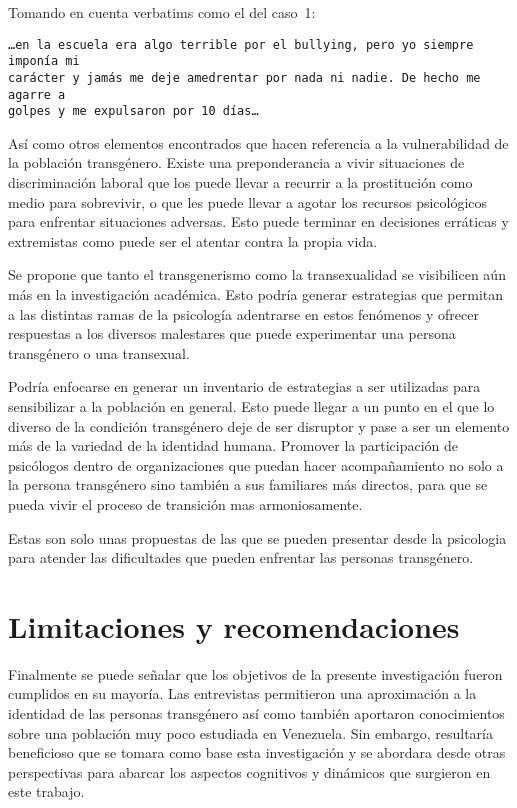 Tomando en cuenta verbatims como el del caso~1:

\begin{verbatim}
…en la escuela era algo terrible por el bullying, pero yo siempre imponía mi
carácter y jamás me deje amedrentar por nada ni nadie. De hecho me agarre a
golpes y me expulsaron por 10 días…
\end{verbatim}

Así como otros elementos encontrados que hacen referencia a la vulnerabilidad de
la población transgénero. Existe una preponderancia a vivir situaciones de
discriminación laboral que los puede llevar a recurrir a la prostitución como
medio para sobrevivir, o que les puede llevar a agotar los recursos psicológicos
para enfrentar situaciones adversas. Esto puede terminar en decisiones erráticas
y extremistas como puede ser el atentar contra la propia vida.

Se propone que tanto el transgenerismo como la transexualidad se
visibilicen aún más en la investigación académica. Esto podría
generar estrategias que permitan a las distintas ramas de la
psicología adentrarse en estos fenómenos y ofrecer respuestas a
los diversos malestares que puede experimentar una persona
transgénero o una transexual.

Podría enfocarse en generar un inventario de estrategias a ser utilizadas para
sensibilizar a la población en general. Esto puede llegar a un punto en el que
lo diverso de la condición transgénero deje de ser disruptor y pase a ser un
elemento más de la variedad de la identidad humana. Promover la participación de
psicólogos dentro de organizaciones que puedan hacer acompañamiento no solo a la
persona transgénero sino también a sus familiares más directos, para que se
pueda vivir el proceso de transición mas armoniosamente.

Estas son solo unas propuestas de las que se pueden presentar desde la
psicologia para atender las dificultades que pueden enfrentar
las personas transgénero.

\section{Limitaciones y recomendaciones}

Finalmente se puede señalar que los objetivos de la presente investigación
fueron cumplidos en su mayoría. Las entrevistas permitieron una aproximación a
la identidad de las personas transgénero así como también aportaron
conocimientos sobre una población muy poco estudiada en Venezuela. Sin embargo,
resultaría beneficioso que se tomara como base esta investigación y se abordara
desde otras perspectivas para abarcar los aspectos cognitivos y dinámicos que
surgieron en este trabajo.

